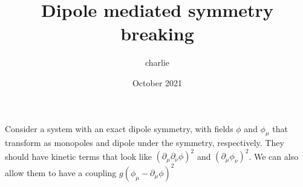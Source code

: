 \documentclass[12pt]{article}
\title{Dipole mediated symmetry breaking}
\author{charlie}
\date{October 2021}
\begin{document}
\maketitle

Consider a system with an exact dipole symmetry, with fields $\phi$ and $\phi_\mu$ that transform as monopoles and dipole under the symmetry, respectively. They should have kinetic terms that look like $(\partial_\mu \partial_\nu \phi)^2$ and $(\partial_\mu \phi_\nu)^2$.  We can also allow them to have a coupling $g(\phi_\mu - \partial_\mu \phi)^2$
\end{document}
